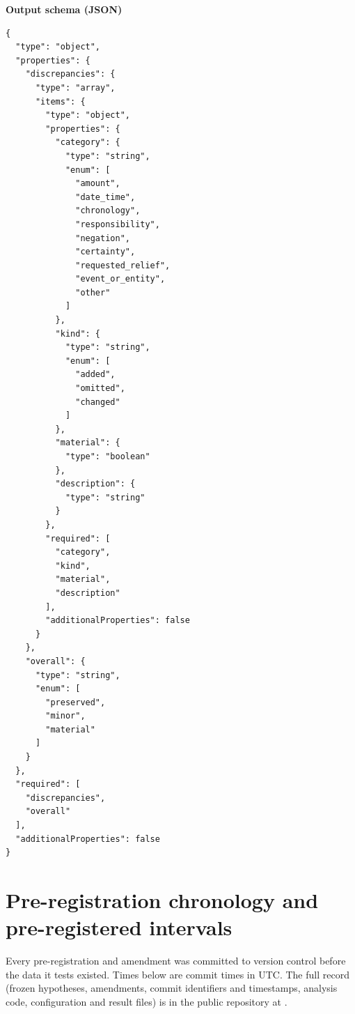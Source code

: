 \textbf{Output schema (JSON)}

\begin{lstlisting}
{
  "type": "object",
  "properties": {
    "discrepancies": {
      "type": "array",
      "items": {
        "type": "object",
        "properties": {
          "category": {
            "type": "string",
            "enum": [
              "amount",
              "date_time",
              "chronology",
              "responsibility",
              "negation",
              "certainty",
              "requested_relief",
              "event_or_entity",
              "other"
            ]
          },
          "kind": {
            "type": "string",
            "enum": [
              "added",
              "omitted",
              "changed"
            ]
          },
          "material": {
            "type": "boolean"
          },
          "description": {
            "type": "string"
          }
        },
        "required": [
          "category",
          "kind",
          "material",
          "description"
        ],
        "additionalProperties": false
      }
    },
    "overall": {
      "type": "string",
      "enum": [
        "preserved",
        "minor",
        "material"
      ]
    }
  },
  "required": [
    "discrepancies",
    "overall"
  ],
  "additionalProperties": false
}
\end{lstlisting}

\section{Pre-registration chronology and pre-registered intervals}\label{app:prereg}
Every pre-registration and amendment was committed to version control before the data it tests existed. Times below are commit times in UTC. The full record (frozen hypotheses, amendments, commit identifiers and timestamps, analysis code, configuration and result files) is in the public repository at \coderepo.

